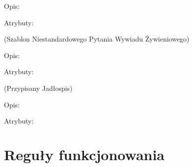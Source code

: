 \begin{enumerate}[label={\textbf{KAT/\protect\threedigits{\theenumi}}}, wide, labelwidth=!, labelindent=0pt, labelsep=0pt, series=reqs]
    Opis: \lipsum[1]
    \par
    Atrybuty:
    \begin{itemize}[series=atr]
         \label{kat:CustomNutritionalInterviewQuestion:id}
         \label{kat:CustomNutritionalInterviewQuestion:ordinalNumber}
         \label{kat:CustomNutritionalInterviewQuestion:question}
         \label{kat:CustomNutritionalInterviewQuestion:answer}
    \end{itemize}

     \label{kat:CustomNutritionalInterviewQuestionTemplate} (Szablon Niestandardowego Pytania Wywiadu Żywieniowego)

    Opis: \lipsum[1]
    \par
    Atrybuty:
    \begin{itemize}[series=atr]
         \label{kat:CustomNutritionalInterviewQuestionTemplate:id}
         \label{kat:CustomNutritionalInterviewQuestionTemplate:question}
         \label{kat:CustomNutritionalInterviewQuestionTemplate:language}
    \end{itemize}

     \label{kat:AssignedMealPlan} (Przypisany Jadłospis)

    Opis: \lipsum[1]
    \par
    Atrybuty:
    \begin{itemize}[series=atr]
         \label{kat:AssignedMealPlan:id}
         \label{kat:AssignedMealPlan:assigmentTime}
    \end{itemize}

\end{enumerate}

\section {Reguły funkcjonowania}\label{sec:functionalRules}

